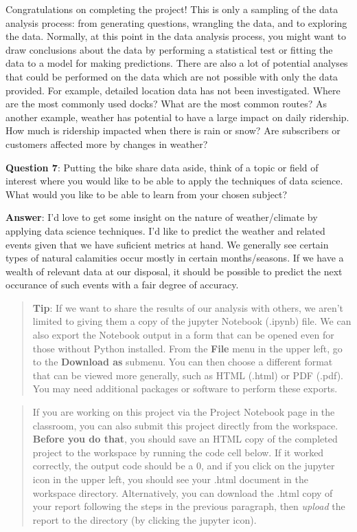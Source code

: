\documentclass[11pt]{article}
\begin{document}
Congratulations on completing the project! This is only a sampling of
the data analysis process: from generating questions, wrangling the
data, and to exploring the data. Normally, at this point in the data
analysis process, you might want to draw conclusions about the data by
performing a statistical test or fitting the data to a model for making
predictions. There are also a lot of potential analyses that could be
performed on the data which are not possible with only the data
provided. For example, detailed location data has not been investigated.
Where are the most commonly used docks? What are the most common routes?
As another example, weather has potential to have a large impact on
daily ridership. How much is ridership impacted when there is rain or
snow? Are subscribers or customers affected more by changes in weather?

\textbf{Question 7}: Putting the bike share data aside, think of a topic
or field of interest where you would like to be able to apply the
techniques of data science. What would you like to be able to learn from
your chosen subject?

\textbf{Answer}: I'd love to get some insight on the nature of
weather/climate by applying data science techniques. I'd like to predict
the weather and related events given that we have suficient metrics at
hand. We generally see certain types of natural calamities occur mostly
in certain months/seasons. If we have a wealth of relevant data at our
disposal, it should be possible to predict the next occurance of such
events with a fair degree of accuracy.

\begin{quote}
\textbf{Tip}: If we want to share the results of our analysis with
others, we aren't limited to giving them a copy of the jupyter Notebook
(.ipynb) file. We can also export the Notebook output in a form that can
be opened even for those without Python installed. From the
\textbf{File} menu in the upper left, go to the \textbf{Download as}
submenu. You can then choose a different format that can be viewed more
generally, such as HTML (.html) or PDF (.pdf). You may need additional
packages or software to perform these exports.
\end{quote}

\begin{quote}
If you are working on this project via the Project Notebook page in the
classroom, you can also submit this project directly from the workspace.
\textbf{Before you do that}, you should save an HTML copy of the
completed project to the workspace by running the code cell below. If it
worked correctly, the output code should be a 0, and if you click on the
jupyter icon in the upper left, you should see your .html document in
the workspace directory. Alternatively, you can download the .html copy
of your report following the steps in the previous paragraph, then
\emph{upload} the report to the directory (by clicking the jupyter
icon).
\end{quote}
\end{document}
